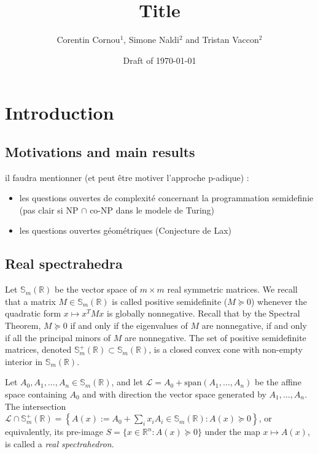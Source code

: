\documentclass[a4paper,12pt]{article}
\title{\bf Title}
\newcommand{\R}{\mathbb{R}} %
\newcommand{\sym}{\mathbb{S}} %
\renewcommand{\span}[1]{{\text{span}(#1)}} %
\newcommand{\calL}{\mathcal{L}} %
\begin{document}
\author{Corentin Cornou$^{1}$, Simone Naldi$^2$ and Tristan Vaccon$^2$}


\date{Draft of \today}

\maketitle

\begin{abstract}
\end{abstract}


\section{Introduction}
\subsection{Motivations and main results}


il faudra mentionner (et peut être motiver l'approche p-adique) :
\begin{itemize}
\item les questions ouvertes de complexité concernant la programmation semidefinie (pas clair si NP $\cap$ co-NP
  dans le modele de Turing)
\item les questions ouvertes géométriques (Conjecture de Lax)
\end{itemize}

\subsection{Real spectrahedra}

Let $\sym_m(\R)$ be the vector space of $m \times m$ real symmetric matrices. We recall that
a matrix $M \in \sym_m(\R)$ is called positive semidefinite ($M \succeq 0$) whenever the quadratic
form $x \mapsto x^TMx$ is globally nonnegative. Recall that by the Spectral Theorem, $M \succeq 0$
if and only if the eigenvalues of $M$ are nonnegative, if and only if all the principal minors of
$M$ are nonnegative. The set of positive semidefinite matrices, denoted $\sym_m^+(\R) \subset \sym_m(\R)$,
is a closed convex cone with non-empty interior in $\sym_m(\R)$.

Let $A_0,A_1,\ldots,A_n \in \sym_m(\R)$, and let $\calL = A_0+\span{A_1,\ldots,A_n}$ be the affine space
containing $A_0$ and with direction the vector space generated by $A_1,\ldots,A_n$. The intersection
$\calL \cap \sym_m^+(\R) = \left\{A(x) := A_0+\sum_i x_i A_i \in \sym_m(\R) : A(x) \succeq 0\right\}$, or
equivalently, its pre-image $S = \{x \in \R^n : A(x) \succeq 0\}$ under the map $x \mapsto A(x)$, is called
a {\it real spectrahedron}.
\end{document}
